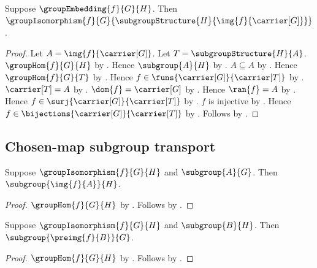 \begin{theorem}\label{group_embedding_image_isomorphism}
    Suppose $\groupEmbedding{f}{G}{H}$.
    Then
        $\groupIsomorphism
            {f}
            {G}
            {\subgroupStructure{H}{\img{f}{\carrier[G]}}}$.
\end{theorem}
\begin{proof}
    Let $A=\img{f}{\carrier[G]}$.
    Let $T=\subgroupStructure{H}{A}$.
    $\groupHom{f}{G}{H}$ by .
    Hence $\subgroup{A}{H}$ by
        .
    $A\subseteq A$ by .
    Hence $\groupHom{f}{G}{T}$ by
        .
    Hence $f\in\funs{\carrier[G]}{\carrier[T]}$ by
        .
    $\carrier[T]=A$ by .
    $\dom{f}=\carrier[G]$ by
        .
    Hence $\ran{f}=A$ by .
    Hence $f\in\surj{\carrier[G]}{\carrier[T]}$ by
        .
    $f$ is injective by .
    Hence $f\in\bijections{\carrier[G]}{\carrier[T]}$ by
        .
    Follows by .
\end{proof}

\subsection{Chosen-map subgroup transport}

\begin{corollary}\label{group_isomorphism_subgroup_image}
    Suppose $\groupIsomorphism{f}{G}{H}$ and $\subgroup{A}{G}$.
    Then $\subgroup{\img{f}{A}}{H}$.
\end{corollary}
\begin{proof}
    $\groupHom{f}{G}{H}$ by
        .
    Follows by .
\end{proof}

\begin{corollary}\label{group_isomorphism_subgroup_preimage}
    Suppose $\groupIsomorphism{f}{G}{H}$ and $\subgroup{B}{H}$.
    Then $\subgroup{\preimg{f}{B}}{G}$.
\end{corollary}
\begin{proof}
    $\groupHom{f}{G}{H}$ by
        .
    Follows by .
\end{proof}

